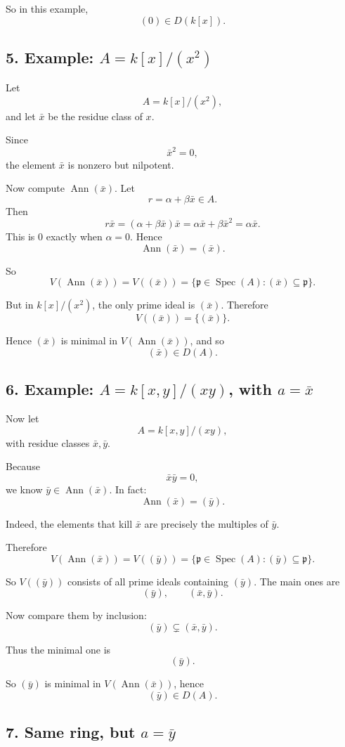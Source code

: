 \documentclass[12pt,a4paper]{article}
\theoremstyle{notespace}
\DeclareMathOperator{\Spec}{Spec}
\DeclareMathOperator{\Ann}{Ann}
\begin{document}
So in this example,
\[
(0)\in D(k[x]).
\]

\subsection{5. Example: \(A=k[x]/(x^2)\)}

Let
\[
A=k[x]/(x^2),
\]
and let \(\bar x\) be the residue class of \(x\).

Since
\[
\bar x^2=0,
\]
the element \(\bar x\) is nonzero but nilpotent.

Now compute \(\Ann(\bar x)\). Let
\[
r=\alpha+\beta \bar x \in A.
\]
Then
\[
r\bar x=(\alpha+\beta \bar x)\bar x
= \alpha \bar x+\beta \bar x^2
= \alpha \bar x.
\]
This is \(0\) exactly when \(\alpha=0\). Hence
\[
\Ann(\bar x)=(\bar x).
\]

So
\[
V(\Ann(\bar x))=V((\bar x))
=\{\mathfrak p\in \Spec(A): (\bar x)\subseteq \mathfrak p\}.
\]

But in \(k[x]/(x^2)\), the only prime ideal is \((\bar x)\). Therefore
\[
V((\bar x))=\{(\bar x)\}.
\]

Hence \((\bar x)\) is minimal in \(V(\Ann(\bar x))\), and so
\[
(\bar x)\in D(A).
\]

\subsection{6. Example: \(A=k[x,y]/(xy)\), with \(a=\bar x\)}

Now let
\[
A=k[x,y]/(xy),
\]
with residue classes \(\bar x,\bar y\).

Because
\[
\bar x\bar y=0,
\]
we know \(\bar y\in \Ann(\bar x)\). In fact:
\[
\Ann(\bar x)=(\bar y).
\]

Indeed, the elements that kill \(\bar x\) are precisely the multiples of \(\bar y\).

Therefore
\[
V(\Ann(\bar x))=V((\bar y))
=\{\mathfrak p\in \Spec(A): (\bar y)\subseteq \mathfrak p\}.
\]

So \(V((\bar y))\) consists of all prime ideals containing \((\bar y)\). The main ones are
\[
(\bar y), \qquad (\bar x,\bar y).
\]

Now compare them by inclusion:
\[
(\bar y)\subsetneq (\bar x,\bar y).
\]

Thus the minimal one is
\[
(\bar y).
\]

So \((\bar y)\) is minimal in \(V(\Ann(\bar x))\), hence
\[
(\bar y)\in D(A).
\]

\subsection{7. Same ring, but \(a=\bar y\)}
\end{document}
